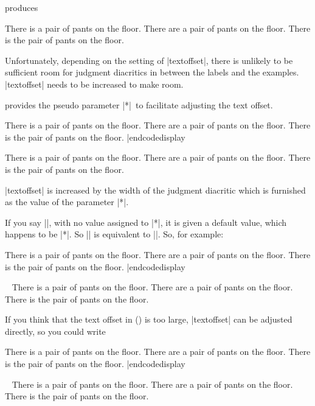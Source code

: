 \noindent produces

\framedisplay
\pex
\a There is a pair of pants on the floor.
\a {}There are a pair of pants on the floor.
\a \ljudge*There is the pair of pants on the floor.
\xe
\endframedisplay

\noindent Unfortunately, depending on the setting of
|textoffset|, there is unlikely to be sufficient room for
judgment diacritics in between the labels and the examples.
|textoffset| needs to be increased to make room.

\Expex\/ provides the pseudo parameter |*|\ to
facilitate adjusting the text offset.

\codedisplay
\pex[*=?*]
\a There is a pair of pants on the floor.
\a {}There are a pair of pants on the floor.
\a \ljudge*There is the pair of pants on the floor.
\xe |endcodedisplay

\framedisplay
\pex[*=?*]
\a There is a pair of pants on the floor.
\a {}There are a pair of pants on the floor.
\a \ljudge*There is the pair of pants on the floor.
\xe
\endframedisplay

\noindent |textoffset| is increased by the width of the judgment
diacritic which is furnished as the value of the parameter |*|.

If you say |\lingset{*}|, with no value assigned to |*|, it is
given a default value, which happens to be |*|.  So |\lingset{*}|
is equivalent to |\lingset{*=*}|.  So, for example:

\codedisplay
\pex[*]
\a There is a pair of pants on the floor.
\a \ljudge* There are a pair of pants on the floor.
\a \ljudge* There is the pair of pants on the floor.
\xe |endcodedisplay

\framedisplay~
\pex[*]
\a There is a pair of pants on the floor.
\a \ljudge* There are a pair of pants on the floor.
\a \ljudge* There is the pair of pants on the floor.
\xe
\endframedisplay

If you think that the text offset in (\blastx) is too large,
|textoffset| can be adjusted directly, so you could write

\codedisplay
\pex[textoffset=!.7em]
\a There is a pair of pants on the floor.
\a {} There are a pair of pants on the floor.
\a \ljudge* There is the pair of pants on the floor.
\xe |endcodedisplay

\framedisplay~
\pex[textoffset=!.7em]
\a There is a pair of pants on the floor.
\a {} There are a pair of pants on the floor.
\a \ljudge* There is the pair of pants on the floor.
\xe
\endframedisplay


